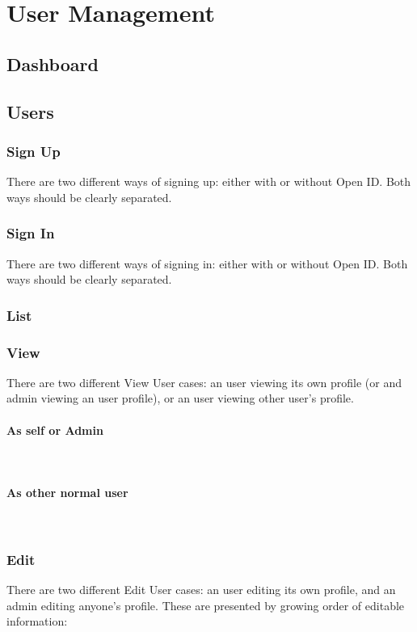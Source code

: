\documentclass[english]{article}%
\begin{document}
\section{User Management}
\subsection{Dashboard}

\subsection{Users}
\subsubsection{Sign Up}
There are two different ways of signing up: either with or without Open ID. Both ways should be clearly separated.
\subsubsection{Sign In}
There are two different ways of signing in: either with or without Open ID. Both ways should be clearly separated.

\subsubsection{List}
\subsubsection{View}
There are two different View User cases: an user viewing its own profile (or and admin viewing an user profile), or an user viewing other user's profile.
\paragraph{As self or Admin}~\\

\paragraph{As other normal user}~\\


\subsubsection{Edit}
There are two different Edit User cases: an user editing its own profile, and an admin editing anyone's profile. These are presented by growing order of editable information:
\end{document}
